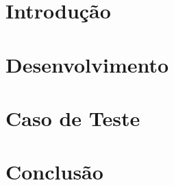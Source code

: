 \documentclass[journal,compsoc]{IEEEtran}\newcommand{\journal}{true}
\begin{document}
\begin{multicols}{2}


	\section{Introdução}\label{intro}
		
	
	\section{Desenvolvimento}\label{hardsoft}
		
	
	\section{Caso de Teste}\label{resultados}
		
	
	\section{Conclusão}\label{conclusion}
		

	\ifCLASSOPTIONcaptionsoff
	  \newpage
	\fi







\end{multicols}
\end{document}

